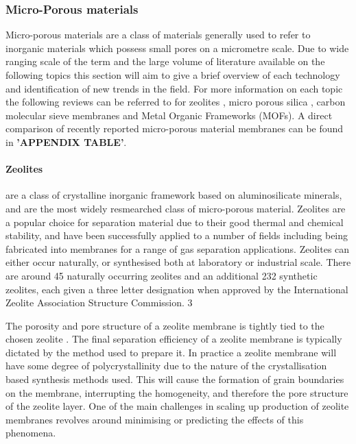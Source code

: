 \subsubsection{Micro-Porous materials}
Micro-porous materials are a class of materials generally used to refer to inorganic 
materials which possess small pores on a micrometre scale. Due to wide ranging scale of the 
term and the large volume of literature available on the following topics this section will 
aim to give a brief overview of each technology and identification of new trends in the field.
For more information on each topic the following reviews can be referred to for zeolites 
\cite{Ockwig2007, Li2015, Lin2001, Lin2013, Gascon2012, Rangnekar2015, Kosinov2016}, micro porous silica \cite{Ockwig2007, Li2015, Khatib2011}, carbon molecular sieve membranes\cite{Ockwig2007, Li2015, Khatib2011, He2017, Saufi2004, Salleh2011, He2017} and 
Metal Organic Frameworks (MOFs).\cite{Qiu2014, Long2009, Caro2011, Kang2017, Kim2018, Barea2014, Li2009, Stassen2017} A direct comparison of recently reported micro-porous 
material membranes can be found in \textbf{'APPENDIX TABLE'}.

\paragraph{Zeolites} are a class of crystalline inorganic framework based on aluminosilicate minerals, 
and are the most widely resmearched class of micro-porous material. Zeolites are a popular 
choice for separation material due to their good thermal and chemical stability, and have 
been successfully applied to a number of fields including being fabricated into membranes 
for a range of gas separation applications.\cite{Ockwig2007} Zeolites can either occur naturally, or 
synthesised both at laboratory or industrial scale. \cite{Rangnekar2015}  There are around 45 naturally 
occurring zeolites and an additional 232 synthetic zeolites, each given a three letter 
designation when approved by the International Zeolite Association Structure Commission. 3\cite{StructureCommissionoftheInternationalZeoliteAssociation}

The porosity and pore structure of a zeolite membrane is tightly tied to the chosen zeolite \cite{StructureCommissionoftheInternationalZeoliteAssociation}. 
The final separation efficiency of a zeolite membrane is typically dictated by the method 
used to prepare it. In practice a zeolite membrane will have some degree of polycrystallinity \cite{Kosinov2016} 
due to the nature of the crystallisation based synthesis methods used. 
This will cause the formation of grain boundaries on the membrane, interrupting the 
homogeneity, and therefore the pore structure of the zeolite layer. One of the main 
challenges in scaling up production of zeolite membranes revolves around minimising or 
predicting the effects of this phenomena. 

